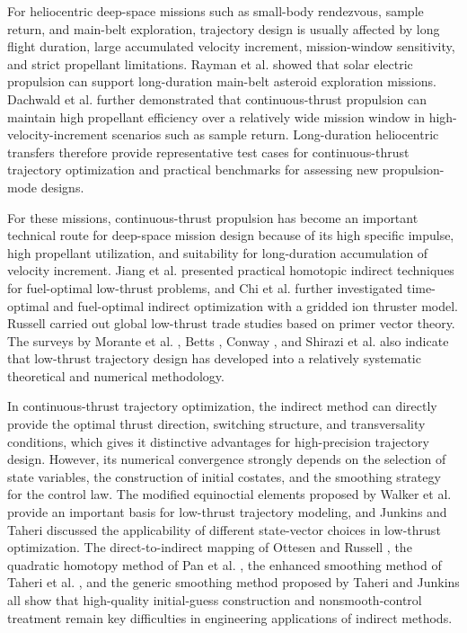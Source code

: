﻿\documentclass{IEEEtaes}
\begin{document}
For heliocentric deep-space missions such as small-body rendezvous, sample return, and main-belt exploration, trajectory design is usually affected by long flight duration, large accumulated velocity increment, mission-window sensitivity, and strict propellant limitations. Rayman et al. \cite{rayman2006} showed that solar electric propulsion can support long-duration main-belt asteroid exploration missions. Dachwald et al. \cite{dachwald2008} further demonstrated that continuous-thrust propulsion can maintain high propellant efficiency over a relatively wide mission window in high-velocity-increment scenarios such as sample return. Long-duration heliocentric transfers therefore provide representative test cases for continuous-thrust trajectory optimization and practical benchmarks for assessing new propulsion-mode designs.

For these missions, continuous-thrust propulsion has become an important technical route for deep-space mission design because of its high specific impulse, high propellant utilization, and suitability for long-duration accumulation of velocity increment. Jiang et al. \cite{jiang2012} presented practical homotopic indirect techniques for fuel-optimal low-thrust problems, and Chi et al. \cite{chi2022} further investigated time-optimal and fuel-optimal indirect optimization with a gridded ion thruster model. Russell \cite{russell2007} carried out global low-thrust trade studies based on primer vector theory. The surveys by Morante et al. \cite{morante2021}, Betts \cite{betts1998}, Conway \cite{conway2012}, and Shirazi et al. \cite{shirazi2018} also indicate that low-thrust trajectory design has developed into a relatively systematic theoretical and numerical methodology.

In continuous-thrust trajectory optimization, the indirect method can directly provide the optimal thrust direction, switching structure, and transversality conditions, which gives it distinctive advantages for high-precision trajectory design. However, its numerical convergence strongly depends on the selection of state variables, the construction of initial costates, and the smoothing strategy for the control law. The modified equinoctial elements proposed by Walker et al. \cite{walker1985} provide an important basis for low-thrust trajectory modeling, and Junkins and Taheri \cite{junkins2019} discussed the applicability of different state-vector choices in low-thrust optimization. The direct-to-indirect mapping of Ottesen and Russell \cite{ottesen2024}, the quadratic homotopy method of Pan et al. \cite{pan2019}, the enhanced smoothing method of Taheri et al. \cite{taheri2016}, and the generic smoothing method proposed by Taheri and Junkins \cite{taheri2018} all show that high-quality initial-guess construction and nonsmooth-control treatment remain key difficulties in engineering applications of indirect methods.
\end{document}
